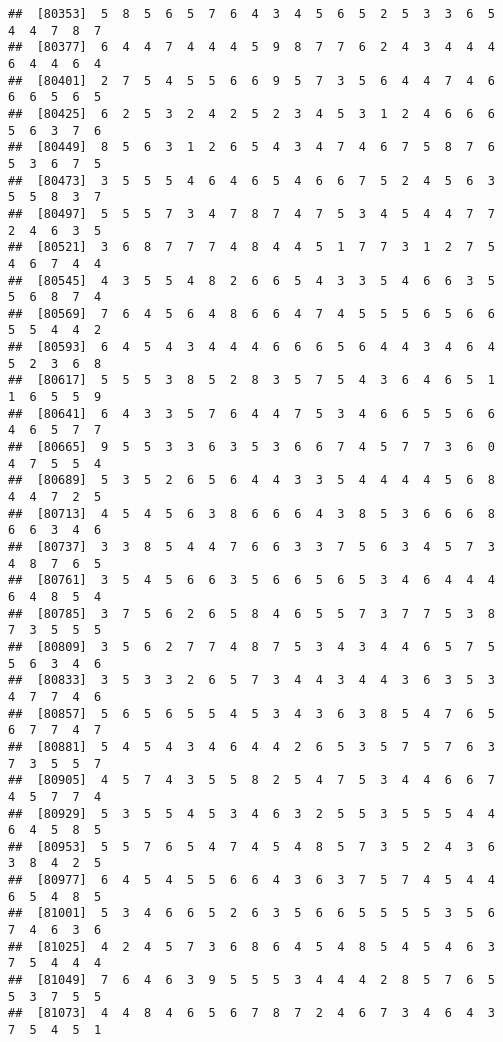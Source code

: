 \documentclass[
]{book}
\begin{document}
\begin{verbatim}
##  [80353]  5  8  5  6  5  7  6  4  3  4  5  6  5  2  5  3  3  6  5  4  4  7  8  7
##  [80377]  6  4  4  7  4  4  4  5  9  8  7  7  6  2  4  3  4  4  4  6  4  4  6  4
##  [80401]  2  7  5  4  5  5  6  6  9  5  7  3  5  6  4  4  7  4  6  6  6  5  6  5
##  [80425]  6  2  5  3  2  4  2  5  2  3  4  5  3  1  2  4  6  6  6  5  6  3  7  6
##  [80449]  8  5  6  3  1  2  6  5  4  3  4  7  4  6  7  5  8  7  6  5  3  6  7  5
##  [80473]  3  5  5  5  4  6  4  6  5  4  6  6  7  5  2  4  5  6  3  5  5  8  3  7
##  [80497]  5  5  5  7  3  4  7  8  7  4  7  5  3  4  5  4  4  7  7  2  4  6  3  5
##  [80521]  3  6  8  7  7  7  4  8  4  4  5  1  7  7  3  1  2  7  5  4  6  7  4  4
##  [80545]  4  3  5  5  4  8  2  6  6  5  4  3  3  5  4  6  6  3  5  5  6  8  7  4
##  [80569]  7  6  4  5  6  4  8  6  6  4  7  4  5  5  5  6  5  6  6  5  5  4  4  2
##  [80593]  6  4  5  4  3  4  4  4  6  6  6  5  6  4  4  3  4  6  4  5  2  3  6  8
##  [80617]  5  5  5  3  8  5  2  8  3  5  7  5  4  3  6  4  6  5  1  1  6  5  5  9
##  [80641]  6  4  3  3  5  7  6  4  4  7  5  3  4  6  6  5  5  6  6  4  6  5  7  7
##  [80665]  9  5  5  3  3  6  3  5  3  6  6  7  4  5  7  7  3  6  0  4  7  5  5  4
##  [80689]  5  3  5  2  6  5  6  4  4  3  3  5  4  4  4  4  5  6  8  4  4  7  2  5
##  [80713]  4  5  4  5  6  3  8  6  6  6  4  3  8  5  3  6  6  6  8  6  6  3  4  6
##  [80737]  3  3  8  5  4  4  7  6  6  3  3  7  5  6  3  4  5  7  3  4  8  7  6  5
##  [80761]  3  5  4  5  6  6  3  5  6  6  5  6  5  3  4  6  4  4  4  6  4  8  5  4
##  [80785]  3  7  5  6  2  6  5  8  4  6  5  5  7  3  7  7  5  3  8  7  3  5  5  5
##  [80809]  3  5  6  2  7  7  4  8  7  5  3  4  3  4  4  6  5  7  5  5  6  3  4  6
##  [80833]  3  5  3  3  2  6  5  7  3  4  4  3  4  4  3  6  3  5  3  4  7  7  4  6
##  [80857]  5  6  5  6  5  5  4  5  3  4  3  6  3  8  5  4  7  6  5  6  7  7  4  7
##  [80881]  5  4  5  4  3  4  6  4  4  2  6  5  3  5  7  5  7  6  3  7  3  5  5  7
##  [80905]  4  5  7  4  3  5  5  8  2  5  4  7  5  3  4  4  6  6  7  4  5  7  7  4
##  [80929]  5  3  5  5  4  5  3  4  6  3  2  5  5  3  5  5  5  4  4  6  4  5  8  5
##  [80953]  5  5  7  6  5  4  7  4  5  4  8  5  7  3  5  2  4  3  6  3  8  4  2  5
##  [80977]  6  4  5  4  5  5  6  6  4  3  6  3  7  5  7  4  5  4  4  6  5  4  8  5
##  [81001]  5  3  4  6  6  5  2  6  3  5  6  6  5  5  5  5  3  5  6  7  4  6  3  6
##  [81025]  4  2  4  5  7  3  6  8  6  4  5  4  8  5  4  5  4  6  3  7  5  4  4  4
##  [81049]  7  6  4  6  3  9  5  5  5  3  4  4  4  2  8  5  7  6  5  5  3  7  5  5
##  [81073]  4  4  8  4  6  5  6  7  8  7  2  4  6  7  3  4  6  4  3  7  5  4  5  1

\end{verbatim}
\end{document}
